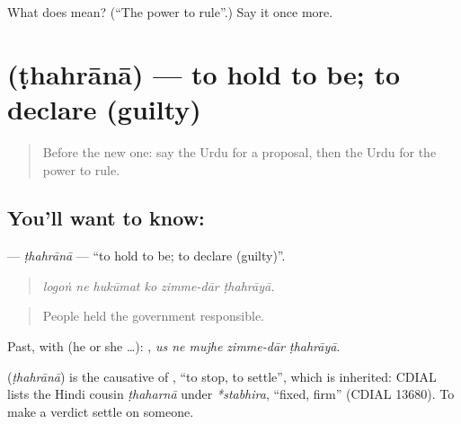 \begin{tcolorbox}[breakable,colback=teal!4,colframe=teal!35!black,title={Before you move on}]
What does  mean? (\textquotedblleft{}The power to rule\textquotedblright{}.) Say it once more.
\end{tcolorbox}
\section[\texorpdfstring{\ur{ٹھہرانا} (ṭhahrānā)}{ٹھہرانا (ṭhahrānā)}]{ (ṭhahrānā) — to hold to be; to declare (guilty)}

\label{lesson:UR-C341-thahrana}



\begin{quote}
Before the new one: say the Urdu for a proposal, then the Urdu for the power to rule.
\end{quote}

\subsection*{You'll want to know: }
\textbf{} — \emph{ṭhahrānā} — \textquotedblleft{}to hold to be; to declare (guilty)\textquotedblright{}.

\begin{quote}
      
\end{quote}

\begin{quote}
\emph{logoṅ ne hukūmat ko zimme-dār ṭhahrāyā.}
\end{quote}

\begin{quote}
People held the government responsible.
\end{quote}

Past, with  (he or she …):      , \emph{us ne mujhe zimme-dār ṭhahrāyā}.

\begin{cousinweb}
\textbf{} (\emph{ṭhahrānā}) is the causative of \textbf{}, \textquotedblleft{}to stop, to settle\textquotedblright{}, which is inherited: CDIAL lists the Hindi cousin \emph{ṭhaharnā} under \emph{*stabhira}, \textquotedblleft{}fixed, firm\textquotedblright{} (CDIAL 13680). To make a verdict settle on someone.
\end{cousinweb}

